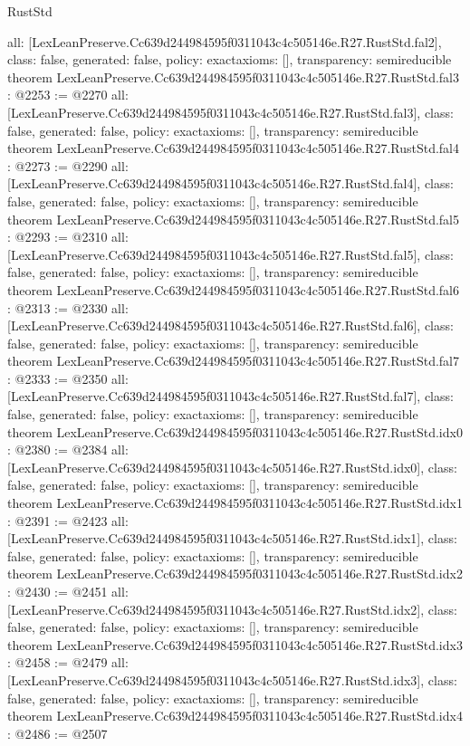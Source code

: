 \begin{lexlean}{RustStd}
\begin{coremodule}
{  all: [LexLeanPreserve.Cc639d244984595f0311043c4c505146e.R27.RustStd.fal2],
  class: false,
  generated: false,
  policy: exact{axioms: []},
  transparency: semireducible
}
theorem LexLeanPreserve.Cc639d244984595f0311043c4c505146e.R27.RustStd.fal3 : @2253 := @2270 {
  all: [LexLeanPreserve.Cc639d244984595f0311043c4c505146e.R27.RustStd.fal3],
  class: false,
  generated: false,
  policy: exact{axioms: []},
  transparency: semireducible
}
theorem LexLeanPreserve.Cc639d244984595f0311043c4c505146e.R27.RustStd.fal4 : @2273 := @2290 {
  all: [LexLeanPreserve.Cc639d244984595f0311043c4c505146e.R27.RustStd.fal4],
  class: false,
  generated: false,
  policy: exact{axioms: []},
  transparency: semireducible
}
theorem LexLeanPreserve.Cc639d244984595f0311043c4c505146e.R27.RustStd.fal5 : @2293 := @2310 {
  all: [LexLeanPreserve.Cc639d244984595f0311043c4c505146e.R27.RustStd.fal5],
  class: false,
  generated: false,
  policy: exact{axioms: []},
  transparency: semireducible
}
theorem LexLeanPreserve.Cc639d244984595f0311043c4c505146e.R27.RustStd.fal6 : @2313 := @2330 {
  all: [LexLeanPreserve.Cc639d244984595f0311043c4c505146e.R27.RustStd.fal6],
  class: false,
  generated: false,
  policy: exact{axioms: []},
  transparency: semireducible
}
theorem LexLeanPreserve.Cc639d244984595f0311043c4c505146e.R27.RustStd.fal7 : @2333 := @2350 {
  all: [LexLeanPreserve.Cc639d244984595f0311043c4c505146e.R27.RustStd.fal7],
  class: false,
  generated: false,
  policy: exact{axioms: []},
  transparency: semireducible
}
theorem LexLeanPreserve.Cc639d244984595f0311043c4c505146e.R27.RustStd.idx0 : @2380 := @2384 {
  all: [LexLeanPreserve.Cc639d244984595f0311043c4c505146e.R27.RustStd.idx0],
  class: false,
  generated: false,
  policy: exact{axioms: []},
  transparency: semireducible
}
theorem LexLeanPreserve.Cc639d244984595f0311043c4c505146e.R27.RustStd.idx1 : @2391 := @2423 {
  all: [LexLeanPreserve.Cc639d244984595f0311043c4c505146e.R27.RustStd.idx1],
  class: false,
  generated: false,
  policy: exact{axioms: []},
  transparency: semireducible
}
theorem LexLeanPreserve.Cc639d244984595f0311043c4c505146e.R27.RustStd.idx2 : @2430 := @2451 {
  all: [LexLeanPreserve.Cc639d244984595f0311043c4c505146e.R27.RustStd.idx2],
  class: false,
  generated: false,
  policy: exact{axioms: []},
  transparency: semireducible
}
theorem LexLeanPreserve.Cc639d244984595f0311043c4c505146e.R27.RustStd.idx3 : @2458 := @2479 {
  all: [LexLeanPreserve.Cc639d244984595f0311043c4c505146e.R27.RustStd.idx3],
  class: false,
  generated: false,
  policy: exact{axioms: []},
  transparency: semireducible
}
theorem LexLeanPreserve.Cc639d244984595f0311043c4c505146e.R27.RustStd.idx4 : @2486 := @2507 {
}
\end{coremodule}
\end{lexlean}

